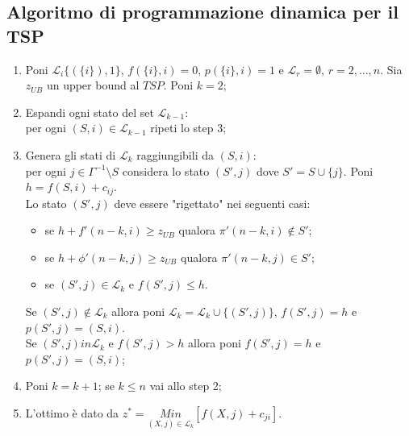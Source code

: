 \subsection{Algoritmo di programmazione dinamica per il TSP}
\begin{enumerate}
	\item Poni $\mathscr{L}_{i}\{(\{i\}),1\}$, $f(\{i\},i)=0$, $p(\{i\},i)=1$ e $\mathscr{L}_{r}=\emptyset$, $r=2,\dots,n$. Sia $z_{UB}$ un upper bound al $TSP$. Poni $k=2$;
	\item Espandi ogni stato del set $\mathscr{L}_{k-1}$:\\
	per ogni $(S,i)\in\mathscr{L}_{k-1}$ ripeti lo step 3;
	\item Genera gli stati di $\mathscr{L}_{k}$ raggiungibili da $(S,i)$:\\
	per ogni $j\in\Gamma^{-1}\setminus S$ considera lo stato $(S',j)$ dove $S'=S\cup\{j\}$. Poni $h=f(S,i)+c_{ij}$.\\
	Lo stato $(S',j)$ deve essere "rigettato" nei seguenti casi:
	\begin{itemize}
		\item se $h+f'(n-k,i)\ge z_{UB}$ qualora $\pi'(n-k,i)\notin S'$;
		\item se $h+\phi'(n-k,j)\ge z_{UB}$ qualora $\pi'(n-k,j)\in S'$;
		\item se $(S',j)\in\mathscr{L}_{k}$ e $f(S',j)\le h$.
	\end{itemize}
	Se $(S',j)\notin\mathscr{L}_{k}$ allora poni $\mathscr{L}_{k}=\mathscr{L}_{k}\cup\{(S',j)\}$, $f(S',j)=h$ e $p(S',j)=(S,i)$.\\
	Se $(S',j)in\mathscr{L}_{k}$ e $f(S',j)>h$ allora poni $f(S',j)=h$ e $p(S',j)=(S,i)$;
	\item Poni $k=k+1$; se $k\le n$ vai allo step 2;
	\item L'ottimo è dato da $z^{*}=\underset{(X,j)\in\mathscr{L}_{k}}{Min}[f(X,j)+c_{ji}]$.
\end{enumerate}